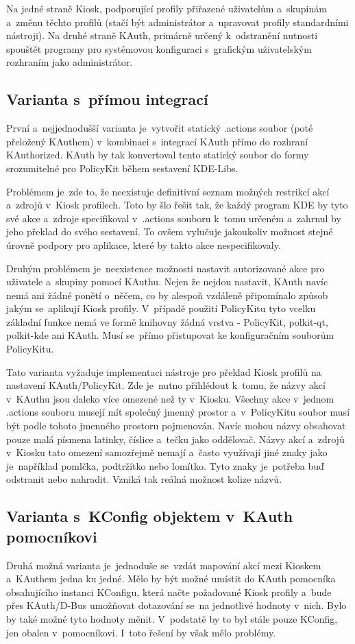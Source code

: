 Na jedné straně Kiosk, podporující profily přiřazené uživatelům a~skupinám a~změnu těchto profilů (stačí být administrátor a~upravovat profily standardními nástroji). Na druhé straně KAuth, primárně určený k~odstranění nutnosti spouštět programy pro systémovou konfiguraci s~grafickým uživatelským rozhraním jako administrátor.

\subsection*{Varianta s~přímou integrací}
První a~nejjednodušší varianta je~vytvořit statický .actions soubor (poté přeložený KAuthem) v~kombinaci s~integrací KAuth přímo do rozhraní KAuthorized. KAuth by tak konvertoval tento statický soubor do formy srozumitelné pro PolicyKit během sestavení KDE-Libs.

Problémem je~zde to, že neexistuje definitivní seznam možných restrikcí akcí a~zdrojů v~Kiosk profilech. Toto by šlo řešit tak, že každý program KDE by tyto své akce a~zdroje specifikoval v~.actions souboru k~tomu určeném a~zahrnul by jeho překlad do svého sestavení. To ovšem vylučuje jakoukoliv možnost stejné úrovně podpory pro aplikace, které by takto akce nespecifikovaly.

Druhým problémem je~neexistence možnosti nastavit autorizované akce pro uživatele a~skupiny pomocí KAuthu. Nejen že nejdou nastavit, KAuth navíc nemá ani žádné ponětí o~něčem, co by alespoň vzdáleně připomínalo způsob jakým se~aplikují Kiosk profily. V~případě použití PolicyKitu tyto vcelku základní funkce nemá ve formě knihovny žádná vrstva - PolicyKit, polkit-qt, polkit-kde ani KAuth. Musí se~přímo přistupovat ke konfiguračním souborům PolicyKitu.

Tato varianta vyžaduje implementaci nástroje pro překlad Kiosk profilů na nastavení KAuth/PolicyKit. Zde je~nutno přihlédout k~tomu, že názvy akcí v~KAuthu jsou daleko více omezené než ty v~Kiosku. Všechny akce v~jednom .actions souboru musejí mít společný jmenný prostor a~v~PolicyKitu soubor musí být podle tohoto jmenného prostoru pojmenován. Navíc mohou názvy obsahovat pouze malá písmena latinky, číslice a~tečku jako oddělovač. Názvy akcí a~zdrojů v~Kiosku tato omezení samozřejmě nemají a~často využívají jiné znaky jako je~například pomlčka, podtržítko nebo lomítko. Tyto znaky je~potřeba buď odstranit nebo nahradit. Vzniká tak reálná možnost kolize názvů.

\subsection*{Varianta s~KConfig objektem v~KAuth pomocníkovi}
Druhá možná varianta je~jednoduše se~vzdát mapování akcí mezi Kioskem a~KAuthem jedna ku jedné. Mělo by být možné umístit do KAuth pomocníka obsahujícího instanci KConfigu, která načte požadované Kiosk profily a~bude přes KAuth/D-Bus umožňovat dotazování se~na jednotlivé hodnoty v~nich. Bylo by také možné tyto hodnoty měnit. V~podstatě by to byl stále pouze KConfig, jen obalen v~pomocníkovi. I~toto řešení by však mělo problémy.

